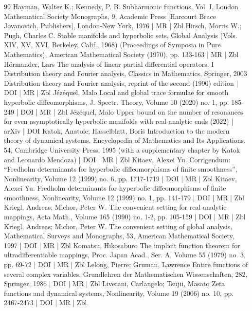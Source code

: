 \begin{thebibliography}{99}
 Hayman, Walter K.; Kennedy, P. B. Subharmonic functions. Vol. I, London Mathematical Society Monographs, 9, Academic Press [Harcourt Brace Jovanovich, Publishers], London-New York, 1976 | MR | Zbl
 Hirsch, Morris W.; Pugh, Charles C. Stable manifolds and hyperbolic sets, Global Analysis (Vols. XIV, XV, XVI, Berkeley, Calif., 1968) (Proceedings of Symposia in Pure Mathematics), American Mathematical Society (1970), pp. 133-163 | MR | Zbl
 Hörmander, Lars The analysis of linear partial differential operators. I Distribution theory and Fourier analysis, Classics in Mathematics, Springer, 2003 Distribution theory and Fourier analysis, reprint of the second (1990) edition | DOI | MR | Zbl
 Jézéquel, Malo Local and global trace formulae for smooth hyperbolic diffeomorphisms, J. Spectr. Theory, Volume 10 (2020) no. 1, pp. 185-249 | DOI | MR | Zbl
 Jézéquel, Malo Upper bound on the number of resonances for even asymptotically hyperbolic manifolds with real-analytic ends (2022) | arXiv | DOI
 Katok, Anatole; Hasselblatt, Boris Introduction to the modern theory of dynamical systems, Encyclopedia of Mathematics and Its Applications, 54, Cambridge University Press, 1995 (with a supplementary chapter by Katok and Leonardo Mendoza) | DOI | MR | Zbl
 Kitaev, Alexei Yu. Corrigendum: “Fredholm determinants for hyperbolic diffeomorphisms of finite smoothness”, Nonlinearity, Volume 12 (1999) no. 6, pp. 1717-1719 | DOI | MR | Zbl
 Kitaev, Alexei Yu. Fredholm determinants for hyperbolic diffeomorphisms of finite smoothness, Nonlinearity, Volume 12 (1999) no. 1, pp. 141-179 | DOI | MR | Zbl
 Kriegl, Andreas; Michor, Peter W. The convenient setting for real analytic mappings, Acta Math., Volume 165 (1990) no. 1-2, pp. 105-159 | DOI | MR | Zbl
 Kriegl, Andreas; Michor, Peter W. The convenient setting of global analysis, Mathematical Surveys and Monographs, 53, American Mathematical Society, 1997 | DOI | MR | Zbl
 Komatsu, Hikosaburo The implicit function theorem for ultradifferentiable mappings, Proc. Japan Acad., Ser. A, Volume 55 (1979) no. 3, pp. 69-72 | DOI | MR | Zbl
 Lelong, Pierre; Gruman, Lawrence Entire functions of several complex variables, Grundlehren der Mathematischen Wissenschaften, 282, Springer, 1986 | DOI | MR | Zbl
 Liverani, Carlangelo; Tsujii, Masato Zeta functions and dynamical systems, Nonlinearity, Volume 19 (2006) no. 10, pp. 2467-2473 | DOI | MR | Zbl

\end{thebibliography}
